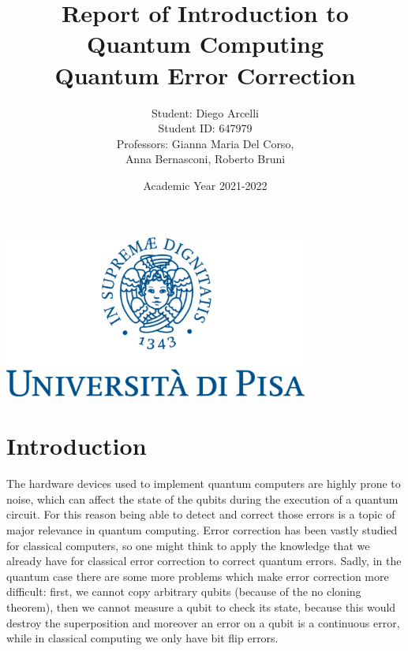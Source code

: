 \documentclass{article}
\begin{document}
	
	\begin{titlepage}
		
		\title{Report of Introduction to Quantum Computing \\ Quantum Error Correction}
		\author{Student: Diego Arcelli\\ Student ID: 647979 \\
			Professors: Gianna Maria Del Corso,\\Anna Bernasconi, Roberto Bruni}
		\date{Academic Year 2021-2022}
		\maketitle
		\centering
		\includegraphics[width=10cm]{./images/unipi_logo.png}
		
	\end{titlepage}
	\newpage
	
	\section{Introduction}
	 
	The hardware devices used to implement quantum computers are highly prone to noise, which can affect the state of the qubits during the execution of a quantum circuit. For this reason being able to detect and correct those errors is a topic of major relevance in quantum computing. Error correction has been vastly studied for classical computers, so one might think to apply the knowledge that we already have for classical error correction to correct quantum errors. Sadly, in the quantum case there are some more problems which make error correction more difficult: first, we cannot copy arbitrary qubits (because of the no cloning theorem), then we cannot measure a qubit to check its state, because this would destroy the superposition and moreover an error on a qubit is a continuous error, while in classical computing we only have bit flip errors. 
	
\end{document}
